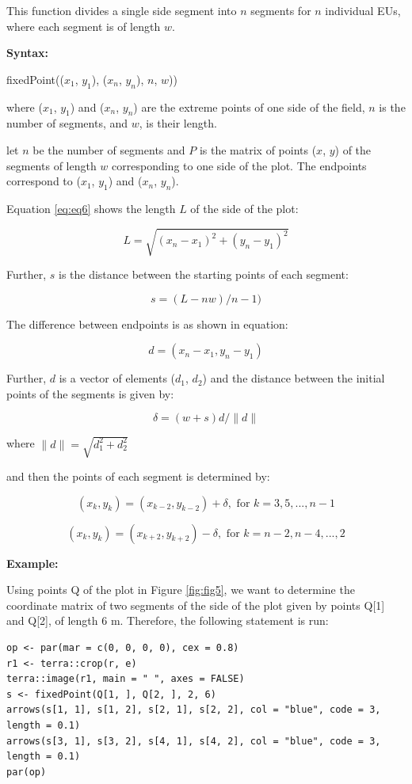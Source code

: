 This function divides a single side segment into \(n\) segments for \(n\) individual EUs, where each segment is of length \(w\).

\textbf{Syntax:}

fixedPoint((\(x_1\), \(y_1\)), (\(x_n\), \(y_n\)), \(n\), \(w\)))

where (\(x_1\), \(y_1\)) and (\(x_n\), \(y_n\)) are the extreme points of one side of the field, \(n\) is the number of segments, and \(w\), is their length.

let \(n\) be the number of segments and \(P\) is the matrix of points (\(x\), \(y\)) of the segments of length \(w\) corresponding to one side of the plot. The endpoints correspond to (\(x_1\), \(y_1\)) and (\(x_n\), \(y_n\)).

Equation \eqref{eq:eq6} shows the length \(L\) of the side of the plot:

\begin{equation} 
    L = \sqrt{(x_n - x_1)^2 + (y_n - y_1)^2} \label{eq:eq6}
\end{equation}

Further, \(s\) is the distance between the starting points of each segment:

\[s = (L - nw)/n - 1)\]

The difference between endpoints is as shown in equation:

\[d = (x_n - x_1, y_n - y_1)\]

Further, \(d\) is a vector of elements (\(d_1\), \(d_2\)) and the distance between the initial points of the segments is given by:

\[\delta = (w + s)d/\|d\|\]

where \(\|d\| = \sqrt{d_1^2 + d_2^2}\)

and then the points of each segment is determined by:

\[(x_k, y_k) = (x_{k-2}, y_{k-2})+\delta,\text{   for } k = 3, 5, ..., n-1 \]

\[(x_k, y_k) = (x_{k+2}, y_{k+2})-\delta,\text{   for } k = n-2, n-4, ..., 2\]

\textbf{Example:}

Using points Q of the plot in Figure \ref{fig:fig5}, we want to determine the coordinate matrix of two segments of the side of the plot given by points Q{[}1{]} and Q{[}2{]}, of length 6 m. Therefore, the following statement is run:

\begin{verbatim}
op <- par(mar = c(0, 0, 0, 0), cex = 0.8)
r1 <- terra::crop(r, e)
terra::image(r1, main = " ", axes = FALSE)
s <- fixedPoint(Q[1, ], Q[2, ], 2, 6)
arrows(s[1, 1], s[1, 2], s[2, 1], s[2, 2], col = "blue", code = 3, length = 0.1)
arrows(s[3, 1], s[3, 2], s[4, 1], s[4, 2], col = "blue", code = 3, length = 0.1)
par(op)
\end{verbatim}

